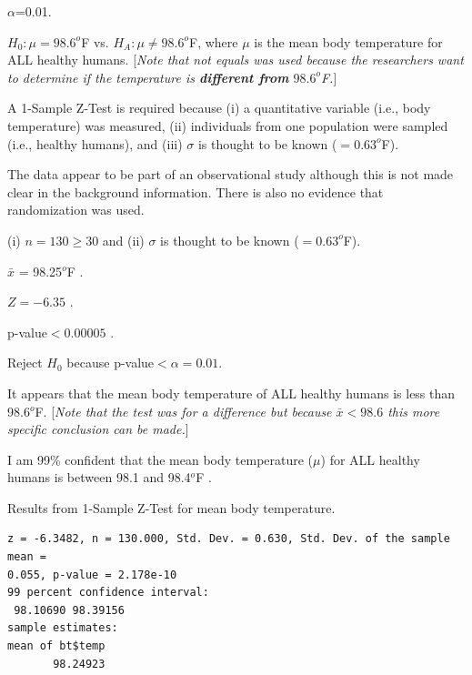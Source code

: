 \documentclass[10pt,openany]{book}\usepackage[]{graphicx}\usepackage[]{color}
\makeatletter
\newenvironment{kframe}{%
 \def\at@end@of@kframe{}%
 \ifinner\ifhmode%
  \def\at@end@of@kframe{\end{minipage}}%
  \begin{minipage}{\columnwidth}%
 \fi\fi%
 \def\FrameCommand##1{\hskip\@totalleftmargin \hskip-\fboxsep
 \colorbox{shadecolor}{##1}\hskip-\fboxsep
     \hskip-\linewidth \hskip-\@totalleftmargin \hskip\columnwidth}%
 \MakeFramed {\advance\hsize-\width
   \@totalleftmargin\z@ \linewidth\hsize
   \@setminipage}}%
 {\par\unskip\endMakeFramed%
 \at@end@of@kframe}
\newenvironment{knitrout}{}{} %
\makeatother
\begin{document}
\vspace*{-12pt}
\begin{Enumerate}
  \item $\alpha$=0.01.
  \item $H_{0}:\mu=98.6^{o}$F vs. $H_{A}:\mu\neq98.6^{o}$F, where $\mu$ is the mean body temperature for ALL healthy humans. [\textit{Note that not equals was used because the researchers want to determine if the temperature is \textbf{different from} $98.6^{o}$F.}]
  \item A 1-Sample Z-Test is required because (i) a quantitative variable (i.e., body temperature) was measured, (ii) individuals from one population were sampled (i.e., healthy humans), and (iii) $\sigma$ is thought to be known ($=0.63^{o}$F).
  \item The data appear to be part of an observational study although this is not made clear in the background information. There is also no evidence that randomization was used.
  \item (i) $n=130\geq30$ and (ii) $\sigma$ is thought to be known ($=0.63^{o}$F).
  \item $\bar{x}$ = 98.25$^{o}$F .
  \item $Z=-6.35$ .
  \item p-value$<0.00005$ .
  \item Reject $H_{0}$ because p-value$<\alpha=0.01$.
  \item It appears that the mean body temperature of ALL healthy humans is less than 98.6$^{o}$F. [\textit{Note that the test was for a difference but because $\bar{x}<98.6$ this more specific conclusion can be made.}]
  \item I am 99\% confident that the mean body temperature ($\mu$) for ALL healthy humans is between 98.1 and 98.4$^{o}$F .
\end{Enumerate}

\begin{table}[htbp]
\vspace*{-8pt}
  \caption{Results from 1-Sample Z-Test for mean body temperature.}
  \label{tab:1Zbtex}
\vspace*{-12pt}
\begin{knitrout}
\color{fgcolor}\begin{kframe}
\begin{verbatim}
z = -6.3482, n = 130.000, Std. Dev. = 0.630, Std. Dev. of the sample mean =
0.055, p-value = 2.178e-10
99 percent confidence interval:
 98.10690 98.39156 
sample estimates:
mean of bt$temp 
       98.24923 
\end{verbatim}
\end{kframe}
\end{knitrout}
\end{table}
\end{document}
